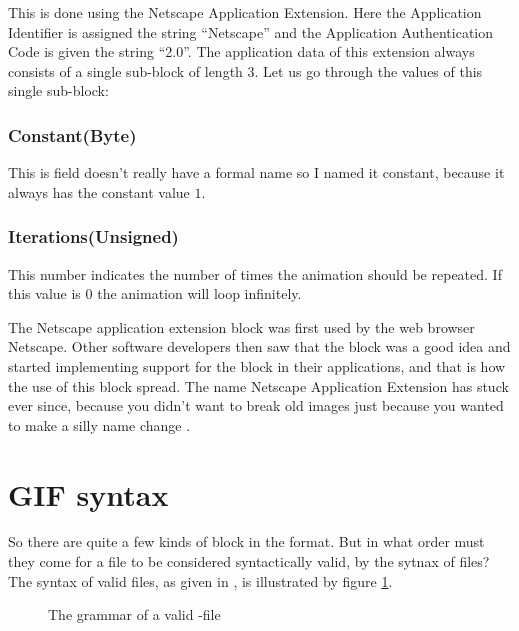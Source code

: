 This is done using the Netscape Application Extension. Here the
Application Identifier is assigned the string ``Netscape'' and the
Application Authentication Code is given the string ``2.0''. The
application data of this extension always consists of a single
sub-block of length 3. Let us go through the values of this single
sub-block: \cite{frazier97:_all_about_gif89}

\subsubsection{Constant(Byte)}

This is field doesn't really have a formal name so I named it
constant, because it always has the constant value $1$.

\subsubsection{Iterations(Unsigned)}

This number indicates the number of times the animation should be
repeated. If this value is $0$ the animation will loop infinitely.

The Netscape application extension block was first used by the web
browser Netscape. Other software developers then saw that the block
was a good idea and started implementing support for the block in
their applications, and that is how the use of this block spread. The
name Netscape Application Extension has stuck ever since, because you
didn't want to break old \gif images just because you wanted to make a silly
name change \cite{walte96:_web_scrip_secret_weapon}.

\section{GIF syntax}
\label{sec:gif-syntax}

So there are quite a few kinds of block in the \gif format. But in what
order must they come for a \gif file to be considered syntactically
valid, by the sytnax of \gif files? The syntax of valid \gif files, as
given in \cite{gif89a}, is illustrated by figure
\ref{fig:gif-grammar}.

\begin{figure}
  \centering


  \caption{The grammar of a valid \gif-file}
  \label{fig:gif-grammar}
\end{figure}

